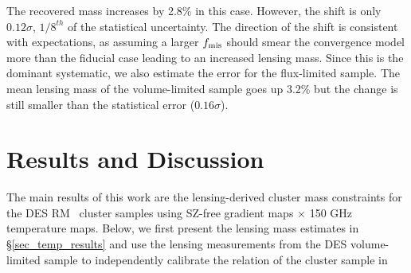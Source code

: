 The recovered mass increases by 2.8\% in this case.
However, the shift is only $0.12\sigma$, $1/8^{th}$ of the statistical uncertainty. %
The direction of the shift is consistent with expectations, as assuming a larger $f_{\rm mis}$ should smear the convergence model more than the fiducial case leading to an increased lensing mass. 
Since this is the dominant systematic, we also estimate the error for the flux-limited sample.
The mean lensing mass of the volume-limited sample goes up 3.2\% but the change is still smaller than the statistical error ($0.16\sigma$). 
  \section{Results and Discussion}\label{mqe_sec_results}

The main results of this work are the lensing-derived cluster mass constraints for the DES RM \whichyear\ cluster samples using \sptpol{} SZ-free gradient maps $\times$ 150 GHz temperature maps.
Below, we first present the lensing mass estimates in \S\ref{sec_temp_results} and use the lensing measurements from the DES \whichyear{} volume-limited sample to independently calibrate the \ML{} relation of the cluster sample in %
